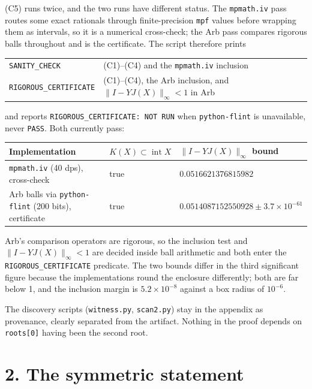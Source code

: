 \documentclass[11pt]{article}
\theoremstyle{remark}
\begin{document}
(C5) runs twice, and the two runs have different status. The \texttt{mpmath.iv} pass routes some exact rationals through finite-precision \texttt{mpf} values before wrapping them as intervals, so it is a numerical cross-check; the Arb pass compares rigorous balls throughout and is the certificate. The script therefore prints
\begin{center}\small
\begin{tabular}{@{}ll@{}}
\toprule
\texttt{SANITY\_CHECK} & (C1)--(C4) and the \texttt{mpmath.iv} inclusion\\
\texttt{RIGOROUS\_CERTIFICATE} & (C1)--(C4), the Arb inclusion, and $\|I-YJ(X)\|_\infty<1$ in Arb\\
\bottomrule
\end{tabular}
\end{center}
and reports \texttt{RIGOROUS\_CERTIFICATE: NOT RUN} when \texttt{python-flint} is unavailable, never \texttt{PASS}. Both currently pass:
\begin{center}\small
\begin{tabular}{@{}lll@{}}
\toprule
Implementation & $K(X)\subset\operatorname{int}X$ & $\|I-YJ(X)\|_\infty$ bound\\
\midrule
\texttt{mpmath.iv} (40 dps), cross-check & true & $0.0516621376815982$\\
Arb balls via \texttt{python-flint} (200 bits), certificate & true & $0.0514087152550928\pm3.7\times10^{-61}$\\
\bottomrule
\end{tabular}
\end{center}
Arb's comparison operators are rigorous, so the inclusion test and $\|I-YJ(X)\|_\infty<1$ are decided inside ball arithmetic and both enter the \texttt{RIGOROUS\_CERTIFICATE} predicate. The two bounds differ in the third significant figure because the implementations round the enclosure differently; both are far below 1, and the inclusion margin is $5.2\times10^{-8}$ against a box radius of $10^{-6}$.

The discovery scripts (\texttt{witness.py}, \texttt{scan2.py}) stay in the appendix as provenance, clearly separated from the artifact. Nothing in the proof depends on \texttt{roots[0]} having been the second root.

\section*{2. The symmetric statement}
\end{document}
